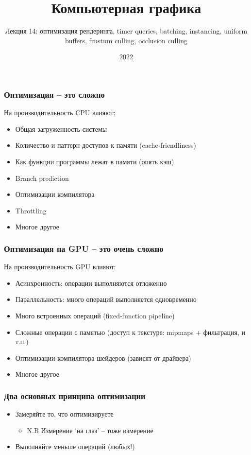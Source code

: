 \documentclass{beamer}
\title{Компьютерная графика}
\subtitle{Лекция 14: оптимизация рендеринга, timer queries, batching, instancing, uniform buffers, frustum culling, occlusion culling}
\date{2022}
\begin{document}
\frame{\titlepage}

\begin{frame}[fragile]
\frametitle{Оптимизация -- это сложно}
На производительность CPU влияют:
\pause
\begin{itemize}
\item Общая загруженность системы
\pause
\item Количество и паттерн доступов к памяти (cache-friendliness)
\pause
\item Как функции программы лежат в памяти (опять кэш)
\pause
\item Branch prediction
\pause
\item Оптимизации компилятора
\pause
\item Throttling
\pause
\item Многое другое
\end{itemize}
\end{frame}

\begin{frame}[fragile]
\frametitle{Оптимизация на GPU -- это очень сложно}
На производительность GPU влияют:
\pause
\begin{itemize}
\item Асинхронность: операции выполняются отложенно
\pause
\item Параллельность: много операций выполняется одновременно
\pause
\item Много встроенных операций (fixed-function pipeline)
\pause
\item Сложные операции с памятью (доступ к текстуре: mipmaps + фильтрация, и т.п.)
\pause
\item Оптимизации компилятора шейдеров (зависят от драйвера)
\pause
\item Многое другое
\end{itemize}
\end{frame}

\begin{frame}[fragile]
\frametitle{Два основных принципа оптимизации}
\begin{itemize}
\item Замеряйте то, что оптимизируете
\pause
\begin{itemize}
\item N.B Измерение `на глаз' -- тоже измерение
\end{itemize}
\pause
\item Выполняйте меньше операций (любых!)
\end{itemize}
\end{frame}
\end{document}
